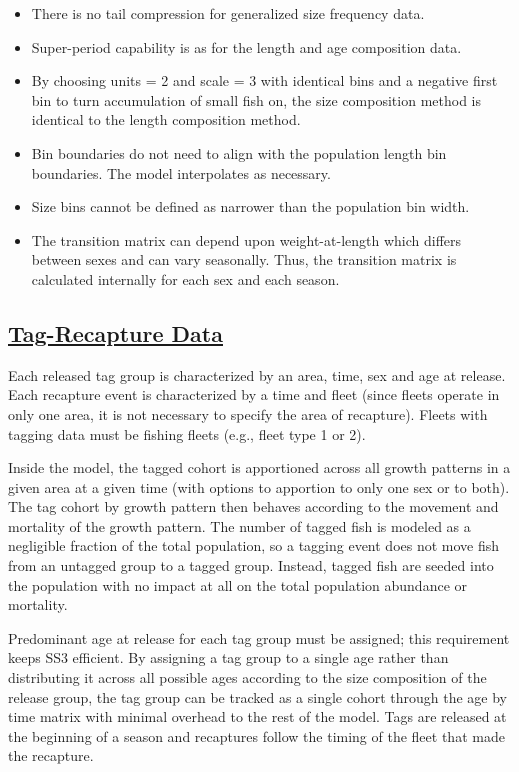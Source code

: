 	\begin{itemize}
		\item There is no tail compression for generalized size frequency data.
		\item Super-period capability is as for the length and age composition data.
		\item By choosing units = 2 and scale = 3 with identical bins and a negative first bin to turn accumulation of small fish on, the size composition method is identical to the length composition method.
		\item Bin boundaries do not need to align with the population length bin boundaries. The model interpolates as necessary.
		\item Size bins cannot be defined as narrower than the population bin width.
		\item The transition matrix can depend upon weight-at-length which differs between sexes and can vary seasonally. Thus, the transition matrix is calculated internally for each sex and each season.
	\end{itemize}

\hypertarget{tag-recapture}{}
\subsection[Tag-Recapture Data]{\protect\hyperlink{tag-recapture}{Tag-Recapture Data}}
Each released tag group is characterized by an area, time, sex and age at release. Each recapture event is characterized by a time and fleet (since fleets operate in only one area, it is not necessary to specify the area of recapture). Fleets with tagging data must be fishing fleets (e.g., fleet type 1 or 2). 

Inside the model, the tagged cohort is apportioned across all growth patterns in a given area at a given time (with options to apportion to only one sex or to both). The tag cohort by growth pattern then behaves according to the movement and mortality of the growth pattern. The number of tagged fish is modeled as a negligible fraction of the total population, so a tagging event does not move fish from an untagged group to a tagged group. Instead, tagged fish are seeded into the population with no impact at all on the total population abundance or mortality. 

Predominant age at release for each tag group must be assigned; this requirement keeps SS3 efficient. By assigning a tag group to a single age rather than distributing it across all possible ages according to the size composition of the release group, the tag group can be tracked as a single cohort through the age by time matrix with minimal overhead to the rest of the model. Tags are released at the beginning of a season and recaptures follow the timing of the fleet that made the recapture.

